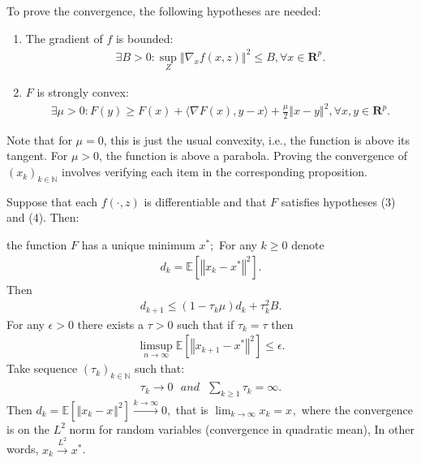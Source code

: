 To prove the convergence, the following hypotheses are needed:
\begin{enumerate}
\item The gradient of $f$ is bounded:
\begin{align}
\exists B > 0\colon \underset{Z}{\sup}\left\Vert\nabla_{x} f(x, z)\right\Vert^{2} \leq B, \forall x \in \mathbf{R}^{p}. \tag{3}
\end{align}
\item $F$ is strongly convex:
\begin{align}
\exists\mu > 0: F(y) \geq F(x) + \langle\nabla F(x), y-x\rangle + \frac{\mu}{2}\left\Vert x-y\right\Vert^{2}, \forall x, y \in \mathbf{R}^{p}. \tag{4}
\end{align}
\end{enumerate}
Note that for $\mu = 0$, this is just the usual convexity, i.e., the function is above its tangent. For $\mu > 0$, the function is above a parabola. Proving the convergence of $(x_{k})_{k\in \mathbb{N}}$ involves verifying each item in the corresponding proposition.
\begin{proposition}\label{pf_sgd_conv_general}
Suppose that each $f(\cdot, z)$ is differentiable and that $F$ satisfies hypotheses (3) and (4). Then:\

the function $F$ has a unique minimum $x^{*}$;\
For any $k \geq 0$ denote
\begin{align}
d_{k} = \mathbb{E}[\left\Vert x_{k}-x^{*}\right\Vert^{2}]. \tag{5}
\end{align}
Then
\begin{align}
d_{k+1} \leq (1 - \tau_{k}\mu)d_{k} + \tau_{k}^{2}B. \tag{6}
\end{align}
For any $\epsilon > 0$ there exists a $\tau > 0$ such that if $\tau_{k} = \tau$ then
\begin{align}
\limsup_{n\rightarrow\infty}{\mathbb{E}[\left\Vert x_{k+1}-x^{*}\right\Vert^{2}]} \leq \epsilon. \tag{7}
\end{align}
Take sequence $(\tau_{k})_{k\in \mathbb{N}}$ such that:\
\begin{align}
\tau_{k} \rightarrow 0 \text{ } and \text{ } \sum_{k\geq 1} \tau_{k} = \infty. \tag{8}
\end{align}
Then $d_{k} = \mathbb{E}[\left\Vert x_{k}-x^{}\right\Vert^{2}] \xrightarrow{k\rightarrow\infty} 0,$ that is $\lim_{k\rightarrow\infty}x_{k} = x^{},$ where the convergence is on the $L^{2}$ norm for random variables (convergence in quadratic mean), In other words, $x_{k} \xrightarrow{L^{2}} x^{*}$.
\end{proposition}
